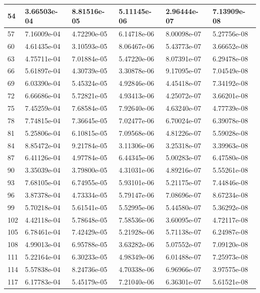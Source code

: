 \documentclass{article}
\begin{document}
\begin{table}[H]
\begin{tabular}{|l|l|l|l|l|l|}
54 & 3.66503e-04 & 8.81516e-05 & 5.11145e-06 & 2.96444e-07 & 7.13909e-08 \\ \hline
57 & 7.16009e-04 & 4.72290e-05 & 6.14718e-06 & 8.00098e-07 & 5.27756e-08 \\ \hline
60 & 4.61435e-04 & 3.10593e-05 & 8.06467e-06 & 5.43773e-07 & 3.66652e-08 \\ \hline
63 & 4.75711e-04 & 7.01884e-05 & 5.47220e-06 & 8.07391e-07 & 6.29478e-08 \\ \hline
66 & 5.61897e-04 & 4.30739e-05 & 3.30878e-06 & 9.17095e-07 & 7.04549e-08 \\ \hline
69 & 6.03390e-04 & 5.45324e-05 & 4.92846e-06 & 4.45418e-07 & 7.34192e-08 \\ \hline
72 & 6.66686e-04 & 5.72821e-05 & 4.93413e-06 & 4.25072e-07 & 3.66201e-08 \\ \hline
75 & 7.45259e-04 & 7.68584e-05 & 7.92640e-06 & 4.63240e-07 & 4.77739e-08 \\ \hline
78 & 7.74815e-04 & 7.36645e-05 & 7.02477e-06 & 6.70024e-07 & 6.39078e-08 \\ \hline
81 & 5.25806e-04 & 6.10815e-05 & 7.09568e-06 & 4.81226e-07 & 5.59028e-08 \\ \hline
84 & 8.85472e-04 & 9.21784e-05 & 3.11306e-06 & 3.25318e-07 & 3.39963e-08 \\ \hline
87 & 6.41126e-04 & 4.97784e-05 & 6.44345e-06 & 5.00283e-07 & 6.47580e-08 \\ \hline
90 & 3.35039e-04 & 3.79800e-05 & 4.31031e-06 & 4.89216e-07 & 5.55261e-08 \\ \hline
93 & 7.68105e-04 & 6.74955e-05 & 5.93101e-06 & 5.21175e-07 & 7.44846e-08 \\ \hline
96 & 3.87378e-04 & 4.73334e-05 & 5.79147e-06 & 7.08696e-07 & 8.67234e-08 \\ \hline
99 & 5.70218e-04 & 5.61541e-05 & 5.52995e-06 & 5.44580e-07 & 5.36292e-08 \\ \hline
102 & 4.42118e-04 & 5.78648e-05 & 7.58536e-06 & 3.60095e-07 & 4.72117e-08 \\ \hline
105 & 6.78461e-04 & 7.42429e-05 & 5.21928e-06 & 5.71138e-07 & 6.24987e-08 \\ \hline
108 & 4.99013e-04 & 6.95788e-05 & 3.63282e-06 & 5.07552e-07 & 7.09120e-08 \\ \hline
111 & 5.22164e-04 & 6.30233e-05 & 4.98349e-06 & 6.01488e-07 & 7.25973e-08 \\ \hline
114 & 5.57838e-04 & 8.24736e-05 & 4.70338e-06 & 6.96966e-07 & 3.97575e-08 \\ \hline
117 & 6.17783e-04 & 5.45179e-05 & 7.21040e-06 & 6.36301e-07 & 5.61521e-08 \\ \hline

\end{tabular}
\end{table}
\end{document}
